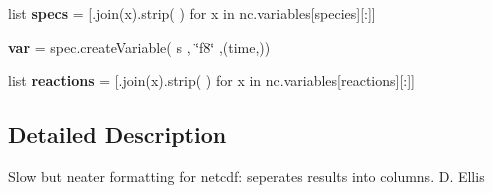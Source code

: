 \begin{DoxyCompactItemize}
\item 
\mbox{\label{namespacereformat__netcdf_a06c9b28af77731982e7f89287c528a03}} 
list {\bfseries specs} = \mbox{[}\textquotesingle{}\textquotesingle{}.join(x).strip(\textquotesingle{} \textquotesingle{}) for x in nc.\+variables\mbox{[}\textquotesingle{}species\textquotesingle{}\mbox{]}\mbox{[}\+:\mbox{]}\mbox{]}
\item 
\mbox{\label{namespacereformat__netcdf_af2cd0630e7e0e28d6cda1ab4c03ed7b2}} 
{\bfseries var} = spec.\+create\+Variable( s , \char`\"{}f8\char`\"{} ,(\textquotesingle{}time\textquotesingle{},))
\item 
\mbox{\label{namespacereformat__netcdf_a79569a9841834f542c1bd777b8f0cb89}} 
list {\bfseries reactions} = \mbox{[}\textquotesingle{}\textquotesingle{}.join(x).strip(\textquotesingle{} \textquotesingle{}) for x in nc.\+variables\mbox{[}\textquotesingle{}reactions\textquotesingle{}\mbox{]}\mbox{[}\+:\mbox{]}\mbox{]}
\end{DoxyCompactItemize}


\subsection{Detailed Description}
\begin{DoxyVerb}Slow but neater formatting for netcdf: seperates results into columns.
D. Ellis
\end{DoxyVerb}
 